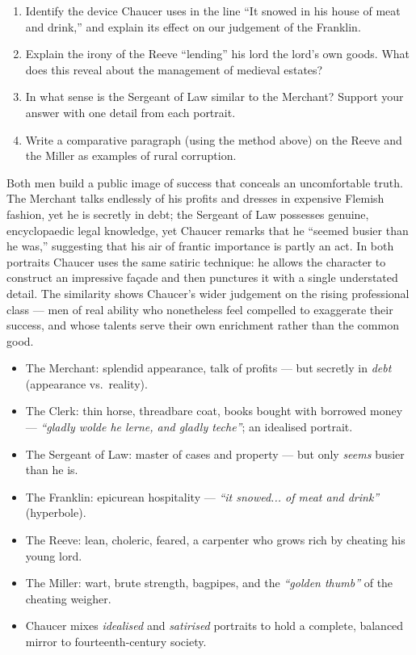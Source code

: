 \documentclass[11pt]{article}
\newcommand{\cle}[1]{{\popxbold\color{popdark}#1}}
\begin{document}
\begin{exercice}
\begin{enumerate}
\item Identify the device Chaucer uses in the line ``It snowed in his house of meat and drink,'' and explain its effect on our judgement of the Franklin.
\item Explain the irony of the Reeve ``lending'' his lord the lord's own goods. What does this reveal about the management of medieval estates?
\item In what sense is the Sergeant of Law similar to the Merchant? Support your answer with one detail from each portrait.
\item Write a comparative paragraph (using the method above) on the Reeve and the Miller as examples of rural corruption.
\end{enumerate}
\end{exercice}

\begin{corrige}[Exercise n° 3]
Both men build a public image of success that conceals an uncomfortable truth. The Merchant talks endlessly of his profits and dresses in expensive Flemish fashion, yet he is secretly in debt; the Sergeant of Law possesses genuine, encyclopaedic legal knowledge, yet Chaucer remarks that he ``seemed busier than he was,'' suggesting that his air of frantic importance is partly an act. In both portraits Chaucer uses the same satiric technique: he allows the character to construct an impressive façade and then punctures it with a single understated detail. The similarity shows Chaucer's wider judgement on the rising professional class — men of real ability who nonetheless feel compelled to exaggerate their success, and whose talents serve their own enrichment rather than the common good.
\end{corrige}

\begin{aretenir}[To Remember]
\begin{itemize}
\item The \cle{Merchant}: splendid appearance, talk of profits — but secretly in \emph{debt} (appearance vs.\ reality).
\item The \cle{Clerk}: thin horse, threadbare coat, books bought with borrowed money — \emph{``gladly wolde he lerne, and gladly teche''}; an idealised portrait.
\item The \cle{Sergeant of Law}: master of cases and property — but only \emph{seems} busier than he is.
\item The \cle{Franklin}: epicurean hospitality — \emph{``it snowed... of meat and drink''} (hyperbole).
\item The \cle{Reeve}: lean, choleric, feared, a carpenter who grows rich by cheating his young lord.
\item The \cle{Miller}: wart, brute strength, bagpipes, and the \emph{``golden thumb''} of the cheating weigher.
\item Chaucer mixes \emph{idealised} and \emph{satirised} portraits to hold a complete, balanced mirror to fourteenth-century society.
\end{itemize}
\end{aretenir}
\end{document}
